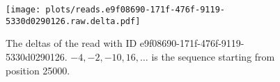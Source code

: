 \begin{figure}
\centering
\texttt{[image: plots/reads.e9f08690-171f-476f-9119-5330d0290126.raw.delta.pdf]}
	\caption{\label{fig:read-e9f-delta}The deltas of the read with ID e9f08690-171f-476f-9119-5330d0290126. $-4, -2, -10, 16,\dots$ is the sequence starting from position 25000.}
\end{figure}

